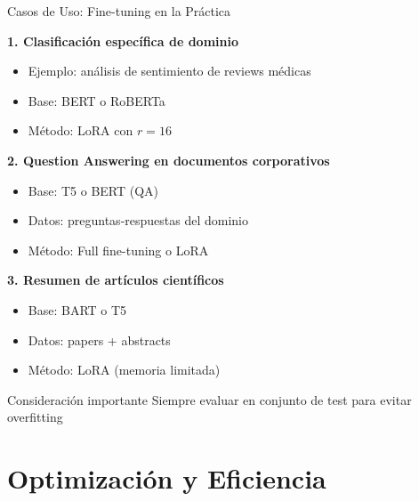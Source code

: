 \begin{frame}{Casos de Uso: Fine-tuning en la Práctica}

\textbf{1. Clasificación específica de dominio}
\begin{itemize}
    \item Ejemplo: análisis de sentimiento de reviews médicas
    \item Base: BERT o RoBERTa
    \item Método: LoRA con $r=16$
\end{itemize}

\vspace{0.5em}

\textbf{2. Question Answering en documentos corporativos}
\begin{itemize}
    \item Base: T5 o BERT (QA)
    \item Datos: preguntas-respuestas del dominio
    \item Método: Full fine-tuning o LoRA
\end{itemize}

\vspace{0.5em}

\textbf{3. Resumen de artículos científicos}
\begin{itemize}
    \item Base: BART o T5
    \item Datos: papers + abstracts
    \item Método: LoRA (memoria limitada)
\end{itemize}

\vspace{0.5em}

\begin{alertblock}{Consideración importante}
Siempre evaluar en conjunto de test para evitar overfitting
\end{alertblock}

\end{frame}

\section{Optimización y Eficiencia}


